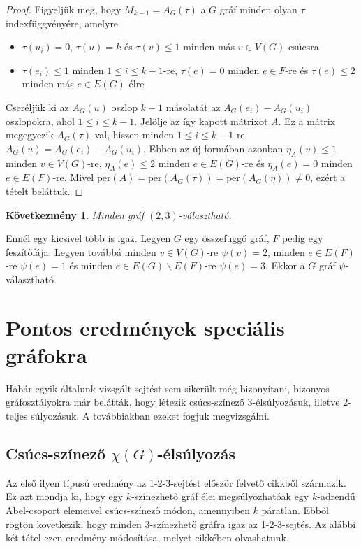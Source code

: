 \documentclass[12pt, a4paper]{report}
\newtheorem{köv}[tét]{Következmény}
\theoremstyle{remark}
\theoremstyle{definition}
\begin{document}
\begin{proof}
Figyeljük meg, hogy $M_{k - 1} = A_G(\tau)$ a $G$ gráf minden olyan $\tau$ indexfüggvényére, amelyre
\begin{itemize}
\item $\tau(u_i) = 0$, $\tau(u) = k$ és $\tau(v) \leq 1$ minden más $v \in V(G)$ csúcsra
\item $\tau(e_i) \leq 1$ minden $1 \leq i \leq k - 1$-re, $\tau(e) = 0$ minden $e \in F$-re és $\tau(e) \leq 2$ minden más $e \in E(G)$ élre
\end{itemize}

Cseréljük ki az $A_G(u)$ oszlop $k - 1$ másolatát az $A_G(e_i) - A_G(u_i)$ oszlopokra, ahol $1 \leq i \leq k - 1$. Jelölje az így kapott mátrixot $A$. Ez a mátrix megegyezik $A_G(\tau)$-val, hiszen minden $1 \leq i \leq k - 1$-re $A_G(u) = A_G(e_i) - A_G(u_i)$. Ebben az új formában azonban $\eta_A(v) \leq 1$ minden $v \in V(G)$-re, $\eta_A(e) \leq 2$ minden $e \in E(G)$-re és $\eta_A(e) = 0$ minden $e \in E(F)$-re. Mivel $\mathrm{per}(A) = \mathrm{per}(A_G(\tau)) = \mathrm{per}(A_G(\eta)) \neq 0$, ezért a tételt beláttuk.
\end{proof}

\begin{köv}
Minden gráf $(2, 3)$-választható.
\end{köv}

Ennél egy kicsivel több is igaz. Legyen $G$ egy összefüggő gráf, $F$ pedig egy feszítőfája. Legyen továbbá minden $v \in V(G)$-re $\psi(v) = 2$, minden $e \in E(F)$-re $\psi(e) = 1$ és minden $e \in E(G) \smallsetminus E(F)$-re $\psi(e) = 3$. Ekkor a $G$ gráf $\psi$-választható. 

\chapter{Pontos eredmények speciális gráfokra}
Habár egyik általunk vizsgált sejtést sem sikerült még bizonyítani, bizonyos gráfosztályokra már belátták, hogy létezik csúcs-színező $3$-élsúlyozásuk, illetve $2$-teljes súlyozásuk. A továbbiakban ezeket fogjuk megvizsgálni.

\section{Csúcs-színező $χ(G)$-élsúlyozás}
Az első ilyen típusú eredmény az 1-2-3-sejtést először felvető cikkből \cite{Karonski2004} származik. Ez azt mondja ki, hogy egy $k$-színezhető gráf élei megsúlyozhatóak egy $k$-adrendű Abel-csoport elemeivel csúcs-színező módon, amennyiben $k$ páratlan. Ebből rögtön következik, hogy minden $3$-színezhető gráfra igaz az 1-2-3-sejtés. Az alábbi két tétel ezen eredmény módosítása, melyet \citeauthor{Lu2011} \cite{Lu2011} cikkében olvashatunk.
\end{document}
